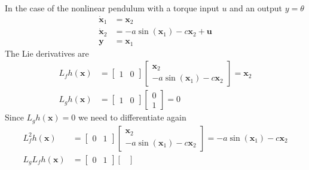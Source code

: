\begin{examplesection}[Pendulum]
    In the case of the nonlinear pendulum with a torque input $u$ and an output $y=\theta$
    \begin{align*}
        \dot{\mathbf{x}}_1 & = \mathbf{x}_2                                      \\
        \dot{\mathbf{x}}_2 & = -a \sin(\mathbf{x}_1)-c \mathbf{x}_2 + \mathbf{u} \\
        \mathbf{y}         & = \mathbf{x}_1
    \end{align*}
    The Lie derivatives are
    \begin{align*}
        L_f h(\mathbf{x}) & = \begin{bmatrix}
                                  1 & 0
                              \end{bmatrix}
        \begin{bmatrix}
            \mathbf{x}_2 \\
            -a \sin(\mathbf{x}_1) -c\mathbf{x}_2
        \end{bmatrix} = \mathbf{x}_2
        \\
        L_g h(\mathbf{x}) & = \begin{bmatrix}
                                  1 & 0
                              \end{bmatrix}
        \begin{bmatrix}
            0 \\
            1
        \end{bmatrix} = 0
    \end{align*}
    Since $L_g h(\mathbf{x}) = 0$ we need to differentiate again
    \begin{align*}
        L_f^2 h(\mathbf{x})   & = \begin{bmatrix}
                                      0 & 1
                                  \end{bmatrix}
        \begin{bmatrix}
            \mathbf{x}_2 \\
            -a \sin(\mathbf{x}_1) -c\mathbf{x}_2
        \end{bmatrix} = -a \sin(\mathbf{x}_1) -c \mathbf{x}_2
        \\
        L_g L_f h(\mathbf{x}) & = \begin{bmatrix}
                                      0 & 1
                                  \end{bmatrix}
        \begin{bmatrix}

\end{bmatrix}
\end{align*}
\end{examplesection}

